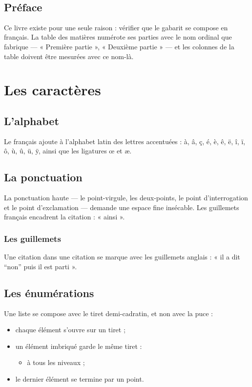 \documentclass[twoside]{memoir}
\title{\Huge\bfseries\booktitle}
\author{\bookauthor}
\begin{document}
\hypersetup{pageanchor=false}
\frontmatter
\maketitle
\thispagestyle{empty}
\thispagestyle{empty}
\raggedbottom

\cleardoublepage
\thispagestyle{plain}
\begingroup
{}
\chapter*{Préface}
Ce livre existe pour une seule raison : vérifier que le gabarit  se
compose en français. La table des matières numérote ses parties avec le nom
ordinal que  fabrique --- « Première partie », « Deuxième partie » ---
et les colonnes de la table doivent être mesurées avec ce nom-là.

\endgroup
\clearpage
\tableofcontents*
\hypersetup{pageanchor=true}
\mainmatter
\part{Les caractères}
\chapter{L'alphabet}
Le français ajoute à l'alphabet latin des lettres accentuées : à, â, ç, é, è,
ê, ë, î, ï, ô, ù, û, ü, ÿ, ainsi que les ligatures œ et æ.
\chapter{La ponctuation}
La ponctuation haute --- le point-virgule, les deux-points, le point
d'interrogation et le point d'exclamation --- demande une espace fine
insécable. Les guillemets français encadrent la citation : « ainsi ».
\section{Les guillemets}
Une citation dans une citation se marque avec les guillemets anglais :
« il a dit ``non'' puis il est parti ».
\chapter{Les énumérations}
Une liste se compose avec le tiret demi-cadratin, et non avec la puce :
\begin{itemize}
\item chaque élément s'ouvre sur un tiret ;
\item un élément imbriqué garde le même tiret :
\begin{itemize}
\item à tous les niveaux ;
\end{itemize}
\item le dernier élément se termine par un point.
\end{itemize}
\end{document}
